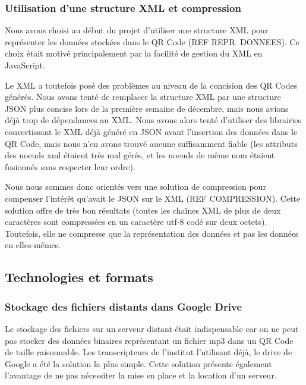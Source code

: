 \subsubsection{Utilisation d'une structure XML et compression}
\par
Nous avons choisi au début du projet d'utiliser une structure XML pour représenter les données stockées dans le QR Code (REF REPR. DONNEES). Ce choix était motivé principalement par la facilité de gestion du XML en JavaScript.
\par
Le XML a toutefois posé des problèmes au niveau de la concision des QR Codes générés. Nous avons tenté de remplacer la structure XML par une structure JSON plus concise lors de la première semaine de décembre, mais nous avions déjà trop de dépendances au XML. Nous avons alors tenté d'utiliser des librairies convertissant le XML déjà généré en JSON avant l'insertion des données dans le QR Code, mais nous n'en avons trouvé aucune suffisamment fiable (les attributs des noeuds xml étaient très mal gérés, et les noeuds de même nom étaient fusionnés sans respecter leur ordre).
\par
Nous nous sommes donc orientés vers une solution de compression pour compenser l'intérêt qu'avait le JSON sur le XML (REF COMPRESSION). Cette solution offre de très bon résultats (toutes les chaînes XML de plus de deux caractères sont compressées en un caractère utf-8 codé sur deux octets). Toutefois, elle ne compresse que la représentation des données et pas les données en elles-mêmes.


\subsection{Technologies et formats}

\subsubsection{Stockage des fichiers distants dans Google Drive}
\par
Le stockage des fichiers sur un serveur distant était indispensable car on ne peut pas stocker des données binaires représentant un fichier mp3 dans un QR Code de taille raisonnable.
Les transcripteurs de l'institut l'utilisant déjà, le drive de Google a été la solution la plus simple. Cette solution présente également l'avantage de ne pas nécessiter la mise en place et la location d'un serveur.


